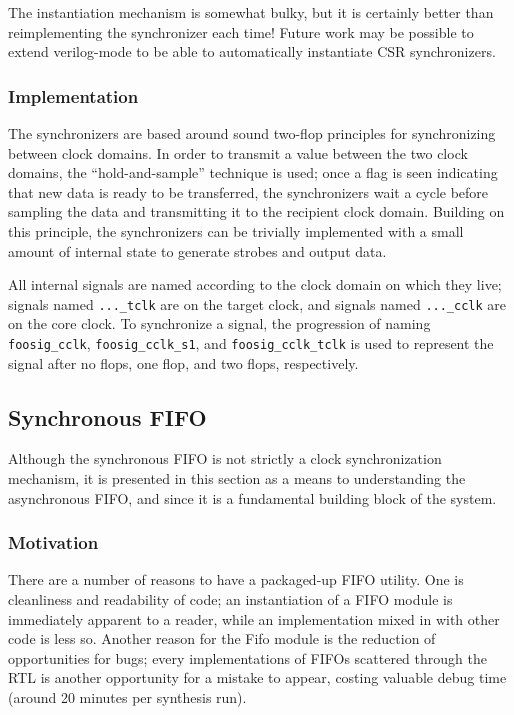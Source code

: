 \documentclass[10pt]{article}
\begin{document}
The instantiation mechanism is somewhat bulky, but it is certainly better
than reimplementing the synchronizer each time! Future work may be possible
to extend verilog-mode to be able to automatically instantiate CSR
synchronizers.

\subsubsection{Implementation}

The synchronizers are based around sound two-flop principles for
synchronizing between clock domains. In order to transmit a value between
the two clock domains, the ``hold-and-sample'' technique is used; once a
flag is seen indicating that new data is ready to be transferred, the
synchronizers wait a cycle before sampling the data and transmitting it to
the recipient clock domain. Building on this principle, the synchronizers
can be trivially implemented with a small amount of internal state to
generate strobes and output data.

All internal signals are named according to the clock domain on which they
live; signals named \texttt{...\_tclk} are on the target clock, and signals
named \texttt{...\_cclk} are on the core clock.  To synchronize a signal,
the progression of naming \texttt{foosig\_cclk}, \texttt{foosig\_cclk\_s1},
and \texttt{foosig\_cclk\_tclk} is used to represent the signal after no
flops, one flop, and two flops, respectively.

\subsection{Synchronous FIFO}

\label{sec:syncfifo}

Although the synchronous FIFO is not strictly a clock synchronization
mechanism, it is presented in this section as a means to understanding the
asynchronous FIFO, and since it is a fundamental building block of the
system.

\subsubsection{Motivation}

There are a number of reasons to have a packaged-up FIFO utility. One is
cleanliness and readability of code; an instantiation of a FIFO module is
immediately apparent to a reader, while an implementation mixed in with
other code is less so. Another reason for the Fifo module is the reduction
of opportunities for bugs; every implementations of FIFOs scattered through
the RTL is another opportunity for a mistake to appear, costing valuable
debug time (around 20 minutes per synthesis run).
\end{document}
